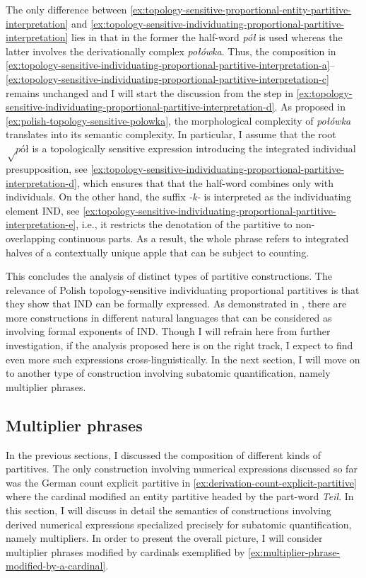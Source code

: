 	The only difference between \ref{ex:topology-sensitive-proportional-entity-partitive-interpretation} and \ref{ex:topology-sensitive-individuating-proportional-partitive-interpretation} lies in that in the former the half-word \textit{pół} is used whereas the latter involves the derivationally complex \textit{połówka}. Thus, the composition in \ref{ex:topology-sensitive-individuating-proportional-partitive-interpretation-a}--\ref{ex:topology-sensitive-individuating-proportional-partitive-interpretation-c} remains unchanged and I will start the discussion from the step in \ref{ex:topology-sensitive-individuating-proportional-partitive-interpretation-d}. As proposed in \ref{ex:polish-topology-sensitive-polowka}, the morphological complexity of \textit{połówka} translates into its semantic complexity. In particular, I assume that the root $\sqrt\textit{pół}$ is a topologically sensitive expression introducing the integrated individual presupposition, see \ref{ex:topology-sensitive-individuating-proportional-partitive-interpretation-d}, which ensures that that the half-word combines only with  individuals. On the other hand, the suffix \textit{-k-} is interpreted as the individuating element IND, see \ref{ex:topology-sensitive-individuating-proportional-partitive-interpretation-e}, i.e., it restricts the denotation of the partitive to non-overlapping continuous parts. As a result, the whole phrase refers to integrated halves of a contextually unique apple that can be subject to counting. 
	
	This concludes the analysis of distinct types of partitive constructions. The relevance of Polish topology-sensitive individuating proportional partitives is that they show that IND can be formally expressed. As demonstrated in  , there are more constructions in different natural languages that can be considered as involving formal exponents of IND. Though I will refrain here from further investigation, if the analysis proposed here is on the right track, I expect to find even more such expressions cross-linguistically. In the next section, I will move on to another type of construction involving subatomic quantification, namely multiplier phrases.
	
	\subsection{Multiplier phrases}\label{sec:multiplier-phrases}
	
	In the previous sections, I discussed the composition of different kinds of partitives. The only construction involving numerical expressions discussed so far was the German count explicit partitive in \ref{ex:derivation-count-explicit-partitive} where the cardinal modified an entity partitive headed by the part-word \textit{Teil}. In this section, I will discuss in detail the semantics of constructions involving derived numerical expressions specialized precisely for subatomic quantification, namely multipliers. In order to present the overall picture, I will consider multiplier phrases modified by cardinals exemplified by \ref{ex:multiplier-phrase-modified-by-a-cardinal}. 
	
